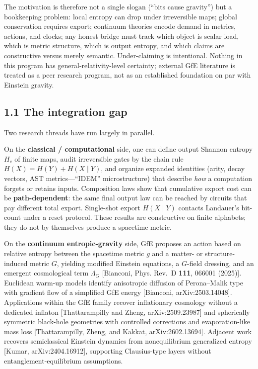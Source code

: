 \documentclass[
  11pt,
]{article}
\newcounter{none} %
\begin{document}
The motivation is therefore not a single slogan (``bits cause gravity'')
but a bookkeeping problem: local entropy can drop under irreversible
maps; global conservation requires export; continuum theories encode
demand in metrics, actions, and clocks; any honest bridge must track
which object is scalar load, which is metric structure, which is output
entropy, and which claims are constructive versus merely semantic.
Under-claiming is intentional. Nothing in this program has
general-relativity-level certainty; external GfE literature is treated
as a peer research program, not as an established foundation on par with
Einstein gravity.

\subsection{1.1 The integration gap}\label{the-integration-gap}

Two research threads have run largely in parallel.

On the \textbf{classical / computational} side, one can define output
Shannon entropy \(H_c\) of finite maps, audit irreversible gates by the
chain rule \(H(X)=H(Y)+H(X\mid Y)\), and organize expanded identities
(arity, decay vectors, AST metrics---``IDEM'' microstructure) that
describe \emph{how} a computation forgets or retains inputs. Composition
laws show that cumulative export cost can be \textbf{path-dependent}:
the same final output law can be reached by circuits that pay different
total export. Single-shot export \(H(X\mid Y)\) contacts Landauer's
bit-count under a reset protocol. These results are constructive on
finite alphabets; they do not by themselves produce a spacetime metric.

On the \textbf{continuum entropic-gravity} side, GfE proposes an action
based on relative entropy between the spacetime metric \(g\) and a
matter- or structure-induced metric \(G\), yielding modified Einstein
equations, a \(G\)-field dressing, and an emergent cosmological term
\(\Lambda_G\) [Bianconi, Phys. Rev.~D \textbf{111}, 066001 (2025)].
Euclidean warm-up models identify anisotropic diffusion of Perona--Malik
type with gradient flow of a simplified GfE energy [Bianconi,
arXiv:2503.14048]. Applications within the GfE family recover
inflationary cosmology without a dedicated inflaton [Thattarampilly
and Zheng, arXiv:2509.23987] and spherically symmetric black-hole
geometries with controlled corrections and evaporation-like mass loss
[Thattarampilly, Zheng, and Kakkat, arXiv:2602.13694]. Adjacent work
recovers semiclassical Einstein dynamics from nonequilibrium generalized
entropy [Kumar, arXiv:2404.16912], supporting Clausius-type layers
without entanglement-equilibrium assumptions.
\end{document}
